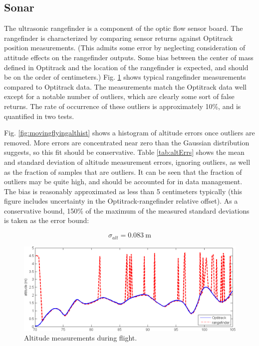 \documentclass{article}
\begin{document}
\subsection{Sonar}

The ultrasonic rangefinder is a component of the optic flow sensor board. The rangefinder is characterized by comparing sensor returns against Optitrack position measurements. (This admits some error by neglecting consideration of attitude effects on the rangefinder outputs. Some bias between the center of mass defined in Optitrack and the location of the rangefinder is expected, and should be on the order of centimeters.) Fig. \ref{fig:movingflyingalt} shows typical rangefinder measurements compared to Optitrack data. The measurements match the Optitrack data well except for a notable number of outliers, which are clearly some sort of false returns. The rate of occurrence of these outliers is approximately 10\%, and is quantified in two tests.

Fig. \ref{fig:movingflyingalthist} shows a histogram of altitude errors once outliers are removed. More errors are concentrated near zero than the Gaussian distribution suggests, so this fit should be conservative. Table \ref{tab:altErrs} shows the mean and standard deviation of altitude measurement errors, ignoring outliers, as well as the fraction of samples that are outliers. It can be seen that the fraction of outliers may be quite high, and should be accounted for in data management. The bias is reasonably approximated as less than 5 centimeters typically (this figure includes uncertainty in the Optitrack-rangefinder relative offset). As a conservative bound, 150\% of the maximum of the measured standard deviations is taken as the error bound:

\begin{equation}
\sigma_{alt} = 0.083 \ \mathrm{m}
\end{equation}

\begin{figure}[tb!]
\centering
\includegraphics[width=\textwidth]{../moving_flying_alt.png}
\caption{Altitude measurements during flight.}
\label{fig:movingflyingalt}
\end{figure}
\end{document}
